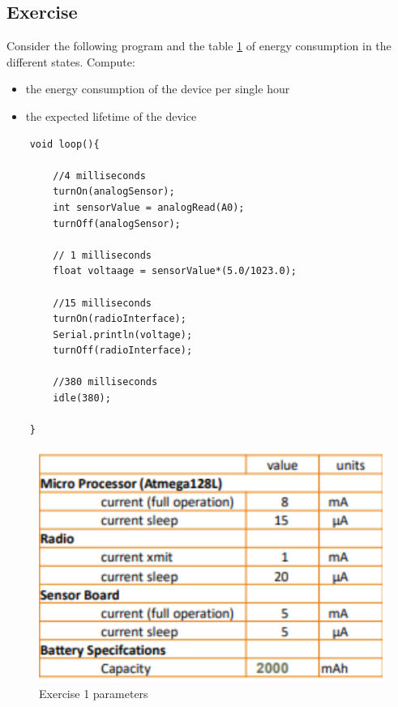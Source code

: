 
	

\subsection{Exercise}\label{sec:exercise}
Consider the following program and the table \ref{chex1-table-dc} of energy consumption in the different states. Compute:
\begin{itemize}
	\item the energy consumption of the device per single hour
	\item the expected lifetime of the device
\end{itemize}
\begin{lstlisting}
	void loop(){
		
		//4 milliseconds
		turnOn(analogSensor);
		int sensorValue = analogRead(A0);
		turnOff(analogSensor);
		
		// 1 milliseconds
		float voltaage = sensorValue*(5.0/1023.0);
		
		//15 milliseconds
		turnOn(radioInterface);
		Serial.println(voltage);
		turnOff(radioInterface);
		
		//380 milliseconds
		idle(380);
		
	}
\end{lstlisting}

\begin{figure}[h]
	\centering\includegraphics[scale=0.45]{images/Pasted image 20230508152346.png}
	\caption{Exercise 1 parameters}
	\label{chex1-table-dc}
\end{figure}



